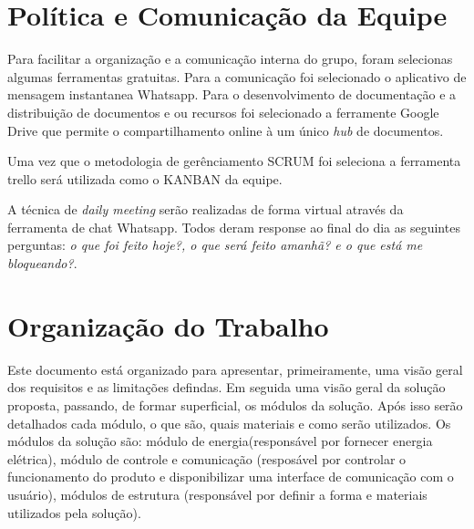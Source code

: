 \section{Política e Comunicação da Equipe}

Para facilitar a organização e a comunicação interna do grupo, foram selecionas algumas ferramentas gratuitas. Para a comunicação foi selecionado o aplicativo de mensagem instantanea Whatsapp.
Para o desenvolvimento de documentação e a distribuição de documentos e ou recursos foi selecionado a ferramente Google Drive que permite o compartilhamento online à um único \textit{hub} de documentos.

Uma vez que o metodologia de gerênciamento SCRUM foi seleciona a ferramenta trello será utilizada como o KANBAN da equipe.

A técnica de \textit{daily meeting} serão realizadas de forma virtual através da ferramenta de chat Whatsapp. Todos deram response ao final do dia as seguintes perguntas: \textit{o que foi feito hoje?, o que será feito amanhã? e o que está me bloqueando?}.

\section{Organização do Trabalho}

Este documento está organizado para apresentar, primeiramente, uma visão geral dos requisitos e as limitações defindas. Em seguida uma visão geral da solução proposta, passando, de formar superficial, os módulos da solução. Após isso serão detalhados cada módulo, o que são, quais materiais e como serão utilizados. Os módulos da solução são: módulo de energia(responsável por fornecer energia elétrica), módulo de controle e comunicação (resposável por controlar o funcionamento do produto e disponibilizar uma interface de comunicação com o usuário), módulos de estrutura (responsável por definir a forma e materiais utilizados pela solução).
